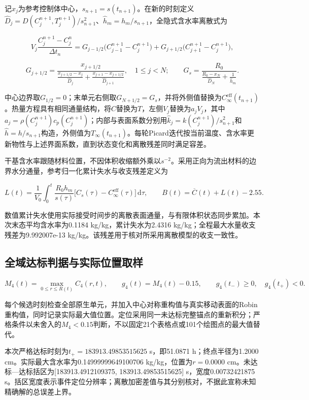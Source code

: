 记$x_j$为参考控制体中心，$s_{n+1}=s(t_{n+1})$。在新的时刻定义$\widehat D_j=D(C_j^{n+1},T_j^{n+1})/s_{n+1}^2$、$\widehat h_m=h_m/s_{n+1}$，全隐式含水率离散式为

\[
V_j\frac{C_j^{n+1}-C_j^n}{\Delta t_n}=G_{j-1/2}\bigl(C_{j-1}^{n+1}-C_j^{n+1}\bigr)+G_{j+1/2}\bigl(C_{j+1}^{n+1}-C_j^{n+1}\bigr),
\]

\[
G_{j+1/2}=\frac{x_{j+1/2}}{\displaystyle\frac{x_{j+1/2}-x_j}{\widehat D_j}+\frac{x_{j+1}-x_{j+1/2}}{\widehat D_{j+1}}},\quad 1\le j<N;\qquad G_s=\frac{R_0}{\displaystyle\frac{R_0-x_N}{\widehat D_N}+\frac1{\widehat h_m}}.
\]

中心边界取$G_{1/2}=0$；末单元右侧取$G_{N+1/2}=G_s$，并将外侧值替换为$C_\infty^{\mathrm{eff}}(t_{n+1})$。热量方程具有相同通量结构，将$C$替换为$T$，左侧$V_j$替换为$a_jV_j$，其中$a_j=\rho(C_j^{n+1})c_p(C_j^{n+1})$；内部与表面系数分别用$\widehat k_j=k(C_j^{n+1})/s_{n+1}^2$和$\widehat h=h/s_{n+1}$构造，外侧值为$T_\infty(t_{n+1})$。每轮Picard迭代按当前温度、含水率更新物性与上述界面系数，直到状态变化和离散残差同时满足容差。

干基含水率跟随材料位置，不因体积收缩额外乘以$s^{-2}$。采用正向为流出材料的边界水分通量，参考归一化累计失水与收支残差定义为

\[
L(t)=\frac1{V_0}\int_0^t\frac{R_0h_m}{s(\tau)}\bigl[C_s(\tau)-C_\infty^{\mathrm{eff}}(\tau)\bigr]\,\mathrm d\tau,\qquad B(t)=\overline C(t)+L(t)-2.55.
\]

数值累计失水使用实际接受时间步的离散表面通量，与有限体积状态同步累加。本次末态平均含水率为0.1184 kg/kg，累计失水为2.4316 kg/kg；全程最大水量收支残差为9.992007e-13 kg/kg。该残差用于核对所采用离散模型的收支一致性。

\subsection{全域达标判据与实际位置取样}

\[
M_4(t)=\max_{0\le r\le R(t)}C_4(r,t),\qquad g_4(t)=M_4(t)-0.15,\qquad g_4(t_-)\ge0,\quad g_4(t_+)<0.
\]

每个候选时刻检查全部原生单元，并加入中心对称重构值与真实移动表面的Robin重构值，同时记录实际最大值位置。定位采用同一未达标完整锚点的重新积分；严格条件以未舍入的$M_4<0.15$判断，不以固定21个表格点或101个绘图点的最大值替代。

本次严格达标时刻为$t_+=183913.49853515625$ s，即51.0871 h；终点半径为1.2000 cm。实际最大含水率为0.14999999649100706 kg/kg，位置为$r=0.0000$ cm。未达标—达标括区为[183913.4912109375, 183913.49853515625] s，宽度0.00732421875 s。括区宽度表示事件定位分辨率；离散加密差值与其分别核对，不据此宣称未知精确解的总误差上界。

